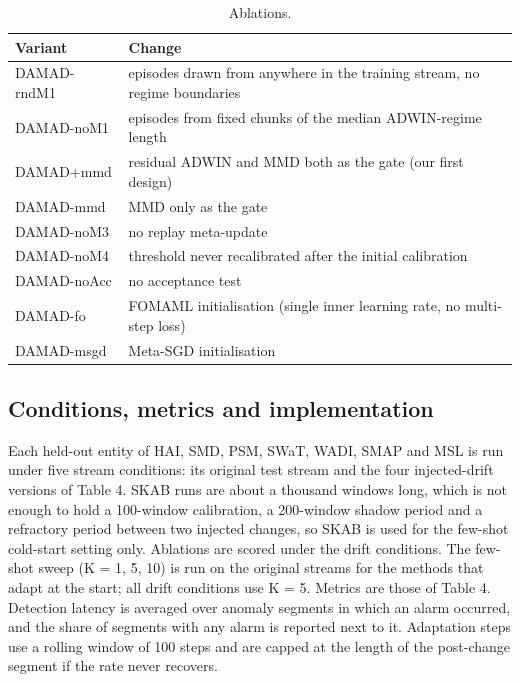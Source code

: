 \begin{table}[H]
\caption{Ablations.}
\centering
\begin{tabularx}{\textwidth}{>{\raggedright\arraybackslash\hsize=0.373\hsize}X>{\raggedright\arraybackslash\hsize=1.627\hsize}X}
\toprule
\textbf{Variant} & \textbf{Change} \\
\midrule
DAMAD-rndM1 & episodes drawn from anywhere in the training stream, no regime boundaries \\
DAMAD-noM1 & episodes from fixed chunks of the median ADWIN-regime length \\
DAMAD+mmd & residual ADWIN and MMD both as the gate (our first design) \\
DAMAD-mmd & MMD only as the gate \\
DAMAD-noM3 & no replay meta-update \\
DAMAD-noM4 & threshold never recalibrated after the initial calibration \\
DAMAD-noAcc & no acceptance test \\
DAMAD-fo & FOMAML initialisation (single inner learning rate, no multi-step loss) \\
DAMAD-msgd & Meta-SGD initialisation \\
\bottomrule
\end{tabularx}
\end{table}

\hypertarget{conditions-metrics-and-implementation}{%
\subsection{Conditions, metrics and implementation}\label{conditions-metrics-and-implementation}}

Each held-out entity of HAI, SMD, PSM, SWaT, WADI, SMAP and MSL is run under five stream conditions: its original test stream and the four injected-drift versions of Table 4. SKAB runs are about a thousand windows long, which is not enough to hold a 100-window calibration, a 200-window shadow period and a refractory period between two injected changes, so SKAB is used for the few-shot cold-start setting only. Ablations are scored under the drift conditions. The few-shot sweep (K = 1, 5, 10) is run on the original streams for the methods that adapt at the start; all drift conditions use K = 5. Metrics are those of Table 4. Detection latency is averaged over anomaly segments in which an alarm occurred, and the share of segments with any alarm is reported next to it. Adaptation steps use a rolling window of 100 steps and are capped at the length of the post-change segment if the rate never recovers.

